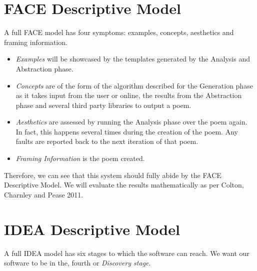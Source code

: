 \section{FACE Descriptive Model}
A full FACE model has four symptoms: examples, concepts, aesthetics and framing information.

\begin{itemize}
\setlength{\itemsep}{0pt}
\item{\emph{Examples} will be showcased by the templates generated by the Analysis and Abstraction phase.}
\item{\emph{Concepts} are of the form of the algorithm described for the Generation phase as it takes input from the user or online, the results from the Abstraction phase and several third party libraries to output a poem.}
\item{\emph{Aesthetics} are assessed by running the Analysis phase over the poem again. In fact, this happens several times during the creation of the poem. Any faults are reported back to the next iteration of that poem.}
\item{\emph{Framing Information} is the poem created.}
\end{itemize}

Therefore, we can see that this system should fully abide by the FACE Descriptive Model. We will evaluate the results mathematically as per Colton, Charnley and Pease 2011.

\section{IDEA Descriptive Model}
A full IDEA model has six stages to which the software can reach. We want our software to be in the, fourth or \emph{Discovery stage}.

